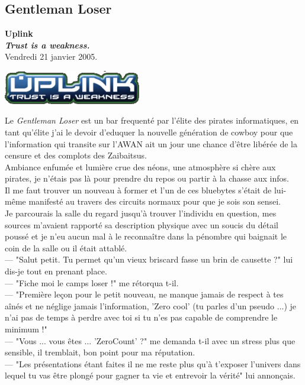 \documentclass[11pt,twoside,a4paper]{book}
\begin{document}
\begin{multicols*}{2}
	\footnotesize

\section{Gentleman Loser}

\textbf{Uplink}~\\
\textbf{\textit{Trust is a weakness. }}~\\
Vendredi 21 janvier 2005. ~\\

\begin{center}
	\includegraphics[width=0.45\textwidth]{img/UplinkTrustIsAWeakness.png}
\end{center}

Le \emph{Gentleman Loser} est un bar frequent{\'e} par l'{\'e}lite des pirates informatiques, en tant qu'{\'e}lite j'ai le devoir d'eduquer la nouvelle g{\'e}n{\'e}ration de cowboy pour que l'information qui transite sur l'AWAN ait un jour une chance d'{\^e}tre lib{\'e}r{\'e}e de la censure et des complots des Zaibaitsus. ~\\

Ambiance enfum{\'e}e et lumi{\`e}re crue des n{\'e}ons, une atmosph{\`e}re si ch{\`e}re aux pirates, je n'{\'e}tais pas l{\`a} pour prendre du repos ou partir {\`a} la chasse aux infos.~\\
Il me faut trouver un nouveau {\`a} former et l'un de ces bluebytes s'{\'e}tait de lui-m{\^e}me manifest{\'e} au travers des circuits normaux pour que je sois son sensei.~\\
Je parcourais la salle du regard jusqu'{\`a} trouver l'individu en question, mes sources m'avaient rapport{\'e} sa description physique avec un soucis du d{\'e}tail pouss{\'e} et je n'eu aucun mal {\`a} le reconna{\^i}tre dans la p{\'e}nombre qui baignait le coin de la salle ou il {\'e}tait attabl{\'e}.~\\
 --- "Salut petit. Tu permet qu'un vieux briscard fasse un brin de causette ?" lui dis-je tout en prenant place.~\\
 --- "Fiche moi le camps loser !" me r{\'e}torqua t-il.~\\
 --- "Premi{\`e}re le\c{c}on pour le petit nouveau, ne manque jamais de respect {\`a} tes a{\^i}n{\'e}s et ne n{\'e}glige jamais l'information, 'Zero cool' (tu parles d'un pseudo ...) je n'ai pas de temps {\`a} perdre avec toi si tu n'es pas capable de comprendre le minimum !"~\\
 --- "Vous ... vous {\^e}tes ... 'ZeroCount' ?" me demanda t-il avec un stress plus que sensible, il tremblait, bon point pour ma r{\'e}putation.~\\
 --- "Les pr{\'e}sentations {\'e}tant faites il ne me reste plus qu'{\`a} t'exposer l'univers dans lequel tu vas {\^e}tre plong{\'e} pour gagner ta vie et entrevoir la v{\'e}rit{\'e}" lui annon\c{c}ais.~\\ 
 

\end{multicols*}
\end{document}
